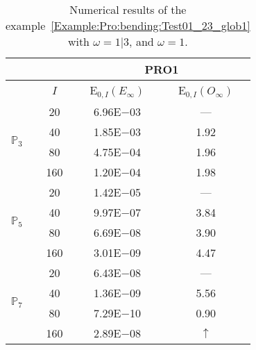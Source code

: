 \begin{table}[H]
\caption{Numerical results of the example~\ref{Example:Pro:bending:Test01_23_glob1} with $\omega=1|3$, and $\omega=1$.}
\setlength{\tabcolsep}{5pt}
\centering
\begin{tabular}{@{}l c c c@{}}
\toprule
 &  & \multicolumn{2}{c}{PRO1}\\
\midrule
 & $I$ & E$_{0,I}(E_{\infty})$ & E$_{0,I}(O_{\infty})$\\
\midrule
\multirow{4}{*}{$\mathbb{P}_{3}$} & 20 & 6.96E$-$03 & ---\\
 & 40 & 1.85E$-$03 & 1.92\\
 & 80 & 4.75E$-$04 & 1.96\\
 & 160 & 1.20E$-$04 & 1.98\\
\midrule
\multirow{4}{*}{$\mathbb{P}_{5}$} & 20 & 1.42E$-$05 & ---\\
 & 40 & 9.97E$-$07 & 3.84\\
 & 80 & 6.69E$-$08 & 3.90\\
 & 160 & 3.01E$-$09 & 4.47\\
\midrule
\multirow{4}{*}{$\mathbb{P}_{7}$} & 20 & 6.43E$-$08 & ---\\
 & 40 & 1.36E$-$09 & 5.56\\
 & 80 & 7.29E$-$10 & 0.90\\
 & 160 & 2.89E$-$08 & $\uparrow$\\
\bottomrule
\end{tabular}
\label{Table:PRO:test_01_23_test18}
\end{table}
